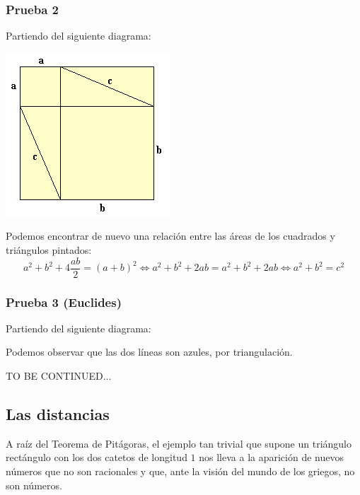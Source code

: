\documentclass{apuntes}
\begin{document}
\subsubsection{Prueba 2}
Partiendo del siguiente diagrama:
\begin{center}
\includegraphics[width=0.8\linewidth/2]{img/pitagoras1.png}
\end{center}

Podemos encontrar de nuevo una relación entre las áreas de los cuadrados y triángulos pintados:
\[a^2+b^2 +4\frac{ab}{2} = (a+b)^2 \iff a^2+b^2 +2ab = a^2+b^2+2ab \iff a^2+b^2=c^2\]

\subsubsection{Prueba 3 (Euclides)}
Partiendo del siguiente diagrama:
\begin{center}
\end{center}

Podemos observar que las dos líneas son azules, por triangulación.

TO BE CONTINUED...


\subsection{Las distancias}
A raíz del Teorema de Pitágoras, el ejemplo tan trivial que supone un triángulo rectángulo con los dos catetos de longitud $1$ nos lleva a la aparición de nuevos números que no son racionales y que, ante la visión del mundo de los griegos, no son números.
\end{document}
